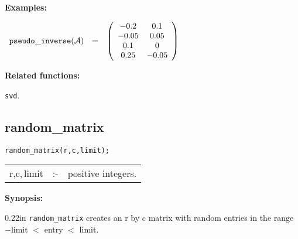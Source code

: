 {\bf Examples:}


\begin{flushleft}
\hspace*{0.1in}
\begin{math}
\begin{array}{ccc}
{\tt pseudo\_inverse}({\cal A}) & = &
        \left( \begin{array}{cc} -0.2 & 0.1 \\ -0.05 & 0.05 \\ 0.1 & 0
\\ 0.25 & -0.05
 \end{array} \right)
\end{array}
\end{math}
\end{flushleft}

{\bf Related functions:}

\hspace*{0.175in} {\tt svd}.

\subsection{random\_matrix}


\hspace*{0.175in} {\tt random\_matrix(r,c,limit);}

\hspace*{0.1in}
\begin{tabular}{l l l}
r,c,$\,$limit &:-& positive integers. \\
\end{tabular}

{\bf Synopsis:} %

\begin{addtolength}{\leftskip}{0.22in}
{\tt random\_matrix} creates an r by c matrix with random
                entries in the range $-$limit $<$ entry $<$ limit.

\end{addtolength}

